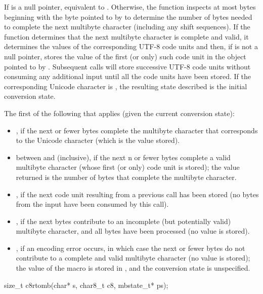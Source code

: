 \begin{itemdescr}
\pnum
\effects
If  is a null pointer,
equivalent to .
Otherwise, the function inspects at most  bytes
beginning with the byte pointed to by 
to determine the number of bytes needed to complete
the next multibyte character (including any shift sequences).
If the function determines
that the next multibyte character is complete and valid,
%
it determines the values of the corresponding UTF-8 code units and then,
if  is not a null pointer,
stores the value of the first (or only) such code unit
in the object pointed to by .
Subsequent calls will store successive UTF-8 code units
without consuming any additional input
until all the code units have been stored.
If the corresponding Unicode character is ,
the resulting state described is the initial conversion state.

\pnum
\returns
The first of the following that applies (given the current conversion state):
\begin{itemize}
\item {}, if the next  or fewer bytes complete
the multibyte character
that corresponds to the  Unicode character
(which is the value stored).
\item between  and  (inclusive),
if the next n or fewer bytes complete a valid multibyte character
(whose first (or only) code unit is stored);
the value returned is the number of bytes that complete the multibyte character.
\item {}, if the next code unit
resulting from a previous call has been stored
(no bytes from the input have been consumed by this call).
\item {}, if the next  bytes
contribute to an incomplete (but potentially valid) multibyte character, and
all  bytes have been processed (no value is stored).
\item {}, if an encoding error occurs,
in which case the next  or fewer bytes do not contribute to
a complete and valid multibyte character (no value is stored);
the value of the macro  is stored in , and
the conversion state is unspecified.
\end{itemize}
\end{itemdescr}

%
\begin{itemdecl}
size_t c8rtomb(char* s, char8_t c8, mbstate_t* ps);
\end{itemdecl}

